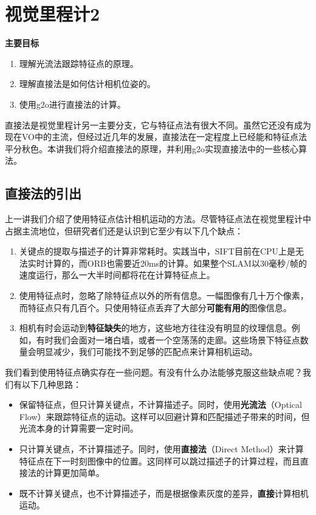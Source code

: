 \chapter{视觉里程计2}
\begin{mdframed}  
	\textbf{主要目标}
	\begin{enumerate}[labelindent=0em,leftmargin=1.5em]
		\item 理解光流法跟踪特征点的原理。
		\item 理解直接法是如何估计相机位姿的。
		\item 使用g2o进行直接法的计算。
	\end{enumerate}
\end{mdframed}

直接法是视觉里程计另一主要分支，它与特征点法有很大不同。虽然它还没有成为现在VO中的主流，但经过近几年的发展，直接法在一定程度上已经能和特征点法平分秋色。本讲我们将介绍直接法的原理，并利用g2o实现直接法中的一些核心算法。

\newpage


\newpage
\section{直接法的引出}
上一讲我们介绍了使用特征点估计相机运动的方法。尽管特征点法在视觉里程计中占据主流地位，但研究者们还是认识到它至少有以下几个缺点：

\begin{enumerate}
	\item 关键点的提取与描述子的计算非常耗时。实践当中，SIFT目前在CPU上是无法实时计算的，而ORB也需要近20ms的计算。如果整个SLAM以30毫秒/帧的速度运行，那么一大半时间都将花在计算特征点上。
	
	\item 使用特征点时，忽略了除特征点以外的所有信息。一幅图像有几十万个像素，而特征点只有几百个。只使用特征点丢弃了大部分\textbf{可能有用的}图像信息。
	
	\item 相机有时会运动到\textbf{特征缺失}的地方，这些地方往往没有明显的纹理信息。例如，有时我们会面对一堵白墙，或者一个空荡荡的走廊。这些场景下特征点数量会明显减少，我们可能找不到足够的匹配点来计算相机运动。 
\end{enumerate}

我们看到使用特征点确实存在一些问题。有没有什么办法能够克服这些缺点呢？我们有以下几种思路：

\begin{itemize}
	\item 保留特征点，但只计算关键点，不计算描述子。同时，使用\textbf{光流法}（Optical Flow）来跟踪特征点的运动。这样可以回避计算和匹配描述子带来的时间，但光流本身的计算需要一定时间。
	\item 只计算关键点，不计算描述子。同时，使用\textbf{直接法}（Direct Method）来计算特征点在下一时刻图像中的位置。这同样可以跳过描述子的计算过程，而且直接法的计算更加简单。
	\item 既不计算关键点，也不计算描述子，而是根据像素灰度的差异，\textbf{直接}计算相机运动。
\end{itemize}

